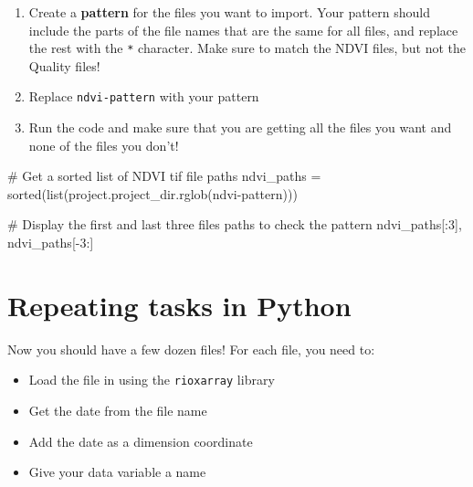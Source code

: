 \documentclass[
  letterpaper,
  DIV=11,
  numbers=noendperiod,
  oneside]{scrreprt}
\newenvironment{Shaded}{\begin{snugshade}}{\end{snugshade}}
\newcommand{\BuiltInTok}[1]{\textcolor[rgb]{0.00,0.23,0.31}{#1}}
\newcommand{\CommentTok}[1]{\textcolor[rgb]{0.37,0.37,0.37}{#1}}
\newcommand{\DecValTok}[1]{\textcolor[rgb]{0.68,0.00,0.00}{#1}}
\newcommand{\NormalTok}[1]{\textcolor[rgb]{0.00,0.23,0.31}{#1}}
\newcommand{\OperatorTok}[1]{\textcolor[rgb]{0.37,0.37,0.37}{#1}}
\newcommand{\StringTok}[1]{\textcolor[rgb]{0.13,0.47,0.30}{#1}}
\providecommand{\tightlist}{%
  \setlength{\itemsep}{0pt}\setlength{\parskip}{0pt}}
\begin{document}
\begin{tcolorbox}[enhanced jigsaw, colbacktitle=quarto-callout-color!10!white, opacityback=0, bottomtitle=1mm, toptitle=1mm, bottomrule=.15mm, left=2mm, colframe=quarto-callout-color-frame, leftrule=.75mm, opacitybacktitle=0.6, colback=white, rightrule=.15mm, toprule=.15mm, breakable, titlerule=0mm, title=\textcolor{quarto-callout-color}{\faInfo}\hspace{0.5em}{Try It}, coltitle=black, arc=.35mm]

\begin{enumerate}
\def\labelenumi{\arabic{enumi}.}
\tightlist
\item
  Create a \textbf{pattern} for the files you want to import. Your
  pattern should include the parts of the file names that are the same
  for all files, and replace the rest with the \texttt{*} character.
  Make sure to match the NDVI files, but not the Quality files!
\item
  Replace \texttt{ndvi-pattern} with your pattern
\item
  Run the code and make sure that you are getting all the files you want
  and none of the files you don't!
\end{enumerate}

\end{tcolorbox}

\begin{Shaded}
\begin{Highlighting}[]
\CommentTok{\# Get a sorted list of NDVI tif file paths}
\NormalTok{ndvi\_paths }\OperatorTok{=} \BuiltInTok{sorted}\NormalTok{(}\BuiltInTok{list}\NormalTok{(project.project\_dir.rglob(}\StringTok{\textquotesingle{}ndvi{-}pattern\textquotesingle{}}\NormalTok{)))}

\CommentTok{\# Display the first and last three files paths to check the pattern}
\NormalTok{ndvi\_paths[:}\DecValTok{3}\NormalTok{], ndvi\_paths[}\OperatorTok{{-}}\DecValTok{3}\NormalTok{:]}
\end{Highlighting}
\end{Shaded}

\section{Repeating tasks in Python}\label{repeating-tasks-in-python}

Now you should have a few dozen files! For each file, you need to:

\begin{itemize}
\tightlist
\item
  Load the file in using the \texttt{rioxarray} library
\item
  Get the date from the file name
\item
  Add the date as a dimension coordinate
\item
  Give your data variable a name
\end{itemize}
\end{document}
